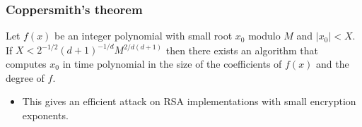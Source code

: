 \documentclass{beamer}
\begin{document}
\begin{frame}
	\frametitle{Coppersmith's theorem}
	\begin{theorem}[D. Coppersmith ('96)]
		Let $f(x)$ be an integer polynomial with small root $x_0$ modulo $M$ and $|x_0|<X$. If $X<2^{-1/2}(d+1)^{-1/d}M^{2/d(d+1)}$ then there exists an algorithm that computes $x_0$ in time polynomial in the size of the coefficients of $f(x)$ and the degree of $f$.\pause
	\end{theorem}
	\begin{itemize}
		\item This gives an efficient attack on RSA implementations with small encryption exponents.
	\end{itemize}
\end{frame}
\end{document}
